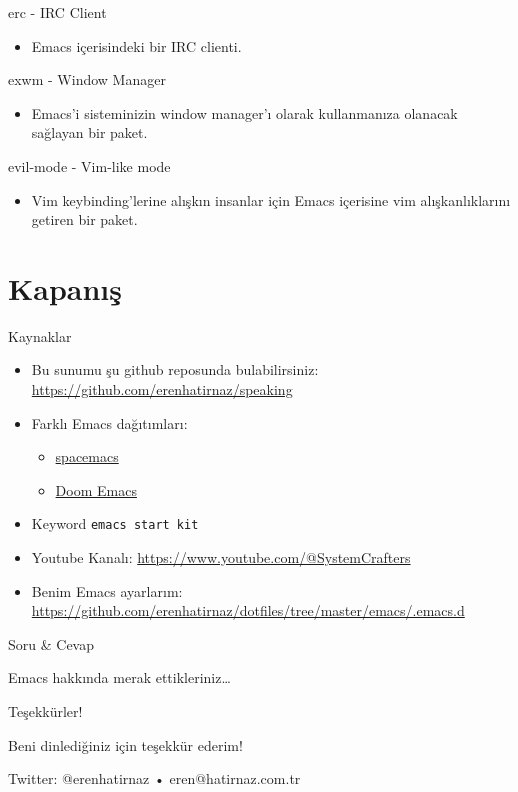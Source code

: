 \documentclass[presentation,smaller]{beamer}
\begin{document}
\begin{frame}[label={sec:org7e0ef98}]{erc - IRC Client}
\begin{itemize}
\item Emacs içerisindeki bir IRC clienti.
\end{itemize}
\end{frame}
\begin{frame}[label={sec:orgfa77013}]{exwm - Window Manager}
\begin{itemize}
\item Emacs'i sisteminizin window manager'ı olarak kullanmanıza olanacak sağlayan bir
paket.
\end{itemize}
\end{frame}
\begin{frame}[label={sec:org359ec22}]{evil-mode - Vim-like mode}
\begin{itemize}
\item Vim keybinding'lerine alışkın insanlar için Emacs içerisine vim
alışkanlıklarını getiren bir paket.
\end{itemize}
\end{frame}
\section{Kapanış}
\label{sec:org095ba85}
\begin{frame}[label={sec:orgd1668fe},fragile]{Kaynaklar}
 \begin{itemize}
\item Bu sunumu şu github reposunda bulabilirsiniz: \url{https://github.com/erenhatirnaz/speaking}
\item Farklı Emacs dağıtımları:
\begin{itemize}
\item \href{https://github.com/syl20bnr/spacemacs/tree/develop}{spacemacs}
\item \href{https://github.com/doomemacs/doomemacs}{Doom Emacs}
\end{itemize}
\item Keyword \texttt{emacs start kit}
\item Youtube Kanalı: \url{https://www.youtube.com/@SystemCrafters}
\item Benim Emacs ayarlarım: \url{https://github.com/erenhatirnaz/dotfiles/tree/master/emacs/.emacs.d}
\end{itemize}
\end{frame}
\begin{frame}[label={sec:org9fa5ad9}]{Soru \& Cevap}
\begin{center}
Emacs hakkında merak ettikleriniz\ldots{}
\end{center}
\end{frame}
\begin{frame}[label={sec:orgae8c1cd}]{Teşekkürler!}
\begin{center}
\alert{\alert{Beni dinlediğiniz için teşekkür ederim!}}

\vspace{1in}

Twitter: @erenhatirnaz • eren@hatirnaz.com.tr
\end{center}
\end{frame}
\end{document}
